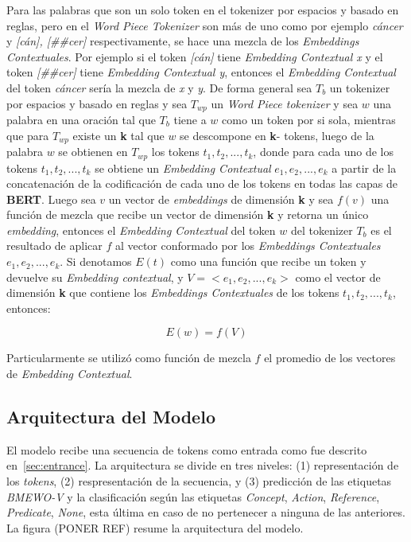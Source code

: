 Para las palabras que son un solo token en el tokenizer por espacios y basado en reglas, pero en el \emph{Word Piece Tokenizer} son m\'as de uno como por ejemplo \emph{c\'ancer} y \emph{[c\'an], [\#\#cer]} respectivamente, se hace una mezcla de los \emph{Embeddings Contextuales}. Por ejemplo si el token \emph{[c\'an]} tiene \emph{Embedding Contextual x} y el token \emph{[\#\#cer]} tiene \emph{Embedding Contextual y}, entonces el \emph{Embedding Contextual} del token \emph{c\'ancer} ser\'ia la mezcla de \emph{x} y \emph{y}. De forma general sea $T_b$ un tokenizer por espacios y basado en reglas y sea $T_{wp}$ un \emph{Word Piece tokenizer} y sea $w$ una palabra en una oraci\'on tal que $T_b$ tiene a $w$ como un token por si sola, mientras que para $T_{wp}$ existe un \textbf{k} tal que $w$ se descompone en \textbf{k}- tokens, luego de la palabra $w$ se obtienen en $T_{wp}$ los tokens $t_1, t_2, ..., t_k$, donde para cada uno de los tokens $t_1, t_2, ..., t_k$ se obtiene un \emph{Embedding Contextual} $e_1, e_2, ..., e_k$ a partir de la concatenaci\'on de la codificaci\'on de cada uno de los tokens en todas las capas de \textbf{BERT}. Luego sea $v$ un vector de \emph{embeddings} de dimensi\'on \textbf{k} y sea $f(v)$ una funci\'on de mezcla que recibe un vector de dimensi\'on \textbf{k} y retorna un \'unico \emph{embedding}, entonces el \emph{Embedding Contextual} del token $w$ del tokenizer $T_b$ es el resultado de aplicar $f$ al vector conformado por los \emph{Embeddings Contextuales} $e_1, e_2, ..., e_k$. Si denotamos $E(t)$ como una funci\'on que recibe un token y devuelve su \emph{Embedding contextual}, y $V = <e_1, e_2, ..., e_k>$ como el vector de dimensi\'on \textbf{k} que contiene los \emph{Embeddings Contextuales} de los tokens $t_1, t_2, ..., t_k$, entonces:

\begin{equation}
	E(w) = f(V)
\end{equation}

Particularmente se utiliz\'o como funci\'on de mezcla $f$ el promedio de los vectores de \emph{Embedding Contextual}.

\subsection{Arquitectura del Modelo}

El modelo recibe una secuencia de tokens como entrada como fue descrito en~\ref{sec:entrance}. La arquitectura se divide en tres niveles: (1) representaci\'on de los \emph{tokens}, (2) respresentaci\'on de la secuencia, y (3) predicci\'on de las etiquetas \emph{BMEWO-V} y la clasificaci\'on seg\'un las etiquetas \emph{Concept}, \emph{Action}, \emph{Reference}, \emph{Predicate}, \emph{None}, esta \'ultima en caso de no pertenecer a ninguna de las anteriores. La figura (PONER REF) resume la arquitectura del modelo.



